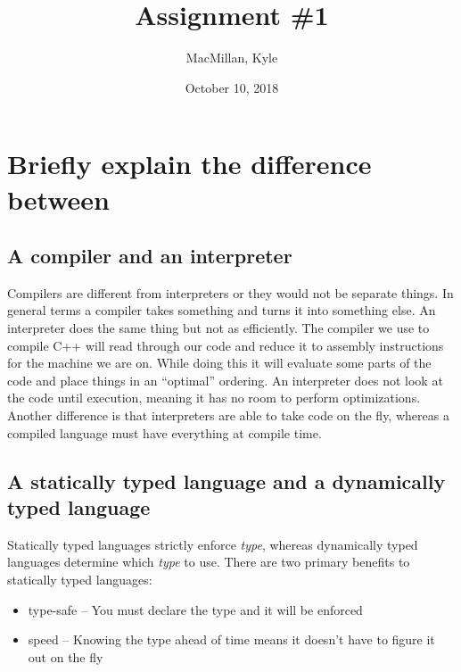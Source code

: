 \documentclass{article}
\title{\textbf{Assignment \#1}}
\author{MacMillan, Kyle}
\date{October 10, 2018}
\begin{document}
\maketitle
{}

\newpage
{}   %
\tableofcontents
{}



\newpage
{}  %
\hypersetup{
    citecolor=blue,
    filecolor=black,
    linkcolor=blue,
    urlcolor=blue
}

\setcounter{page}{1}
\section{Briefly explain the difference between}
\subsection{A compiler and an interpreter}
Compilers are different from interpreters or they would not be separate things. In general terms a compiler takes something and turns it into something else. An interpreter does the same thing but not as efficiently. The compiler we use to compile C++ will read through our code and reduce it to assembly instructions for the machine we are on. While doing this it will evaluate some parts of the code and place things in an ``optimal'' ordering. An interpreter does not look at the code until execution, meaning it has no room to perform optimizations. Another difference is that interpreters are able to take code on the fly, whereas a compiled language must have everything at compile time. 

\subsection{A statically typed language and a dynamically typed language}
Statically typed languages strictly enforce \textit{type}, whereas dynamically typed languages determine which \textit{type} to use. There are two primary benefits to statically typed languages:\\
\begin{itemize}
    \item type-safe -- You must declare the type and it will be enforced
    \item speed -- Knowing the type ahead of time means it doesn't have to figure it out on the fly
\end{itemize}
\end{document}
